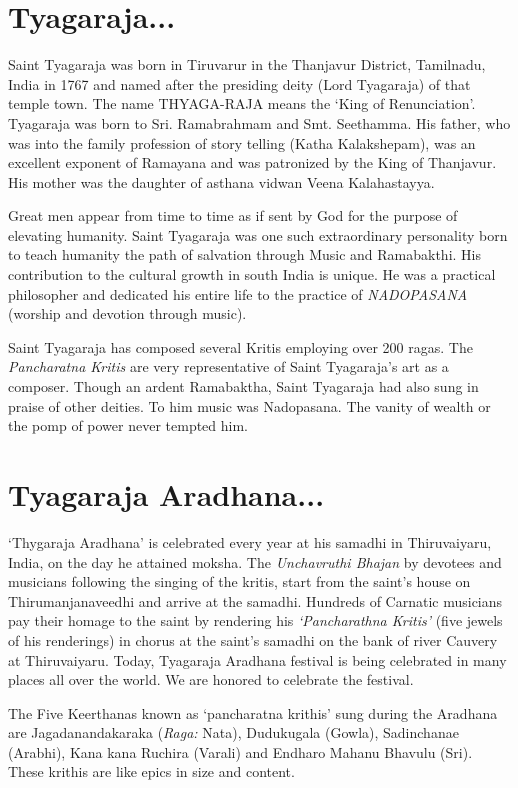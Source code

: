 \documentclass[10pt,letterpaper,twocolumn,landscape]{article}
\begin{document}
\begin{framed}

{
\section*{Tyagaraja...}
Saint Tyagaraja was born in Tiruvarur in the Thanjavur 
District, Tamilnadu, India in 1767 and named after the presiding deity 
(Lord Tyagaraja) of that temple town. The name THYAGA-RAJA 
means the `King of Renunciation'. Tyagaraja was born to Sri. Ramabrahmam 
and Smt. Seethamma. His father, who was into the family
profession of story telling (Katha Kalakshepam), was an excellent exponent of 
Ramayana and was patronized by the King
of Thanjavur. His mother was the daughter of asthana vidwan Veena Kalahastayya.

Great men appear from time to time as if sent by God 
for the purpose of elevating humanity. Saint Tyagaraja 
was one such extraordinary personality born to teach 
humanity the path of salvation through Music and Ramabakthi. 
His contribution to the cultural growth in south India is 
unique. He was a practical philosopher and dedicated his 
entire life to the practice of {\em NADOPASANA} (worship 
and devotion through music).

Saint Tyagaraja has composed several Kritis 
employing over 200 ragas. The {\em Pancharatna Kritis} are 
very representative of Saint Tyagaraja's art as a composer. 
Though an ardent Ramabaktha, 
Saint Tyagaraja had also sung in praise of other deities. 
To him music was Nadopasana. The vanity of
wealth or the pomp of power never tempted him.
}


\section*{Tyagaraja Aradhana...}
`Thygaraja Aradhana' is celebrated every year 
at his samadhi in Thiruvaiyaru, India, on the day he attained moksha. 
The {\em Unchavruthi Bhajan} by devotees and musicians 
following the singing of the kritis, start from 
the saint's house on Thirumanjanaveedhi and arrive 
at the samadhi.
Hundreds of Carnatic musicians pay their homage to 
the saint by rendering his {\em {\large `Pancharathna Kritis'}} 
(five jewels of his renderings) in chorus at the 
saint's samadhi on the bank of river
Cauvery at Thiruvaiyaru. Today, Tyagaraja Aradhana 
festival is being celebrated in many places all over the world.
We are honored to celebrate the festival. 

The Five Keerthanas known as ‘pancharatna krithis’ 
sung during the Aradhana are Jagadanandakaraka ({\em Raga:} Nata), 
Dudukugala (Gowla), Sadinchanae (Arabhi), 
Kana kana Ruchira (Varali) and Endharo Mahanu Bhavulu (Sri).
These krithis are like epics in size and content.


\end{framed}
\end{document}
